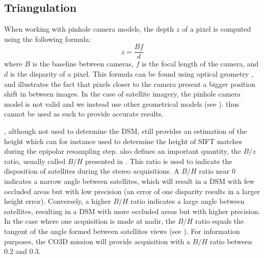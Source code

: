 \subsection{Triangulation}\label{sec:triangulation}
When working with pinhole camera models, the depth $z$ of a pixel is computed using the following formula:
\begin{equation}
	z=\frac{Bf}{d}\label{eq:z_bfd}
\end{equation}
where $B$ is the baseline between cameras, $f$ is the focal length of the camera, and $d$ is the disparity of a pixel. This formula can be found using optical geometry \cite{bolles_epipolar-plane_1987}, and illustrates the fact that pixels closer to the camera present a bigger position shift in between images. In the case of satellite imagery, the pinhole camera model is not valid and we instead use other geometrical models (see ).  thus cannot be used as such to provide accurate results.
\begin{remark}
    , although not used to determine the DSM, still provides an estimation of the height which can for instance used to determine the height of SIFT matches during the epipolar resampling step.  also defines an important quantity, the $B/z$ ratio, usually called $B/H$ presented in . This ratio is used to indicate the disposition of satellites during the stereo acquisitions. A $B/H$ ratio near $0$ indicates a narrow angle between satellites, which will result in a DSM with few occluded areas but with low precision (an error of one disparity results in a larger height error). Conversely, a higher $B/H$ ratio indicates a large angle between satellites, resulting in a DSM with more occluded areas but with higher precision. In the case where one acquisition is made at nadir, the $B/H$ ratio equals the tangent of the angle formed between satellites views (see ). For information purposes, the CO3D mission will provide acquisition with a $B/H$ ratio between $0.2$ and $0.3$.
\end{remark}

